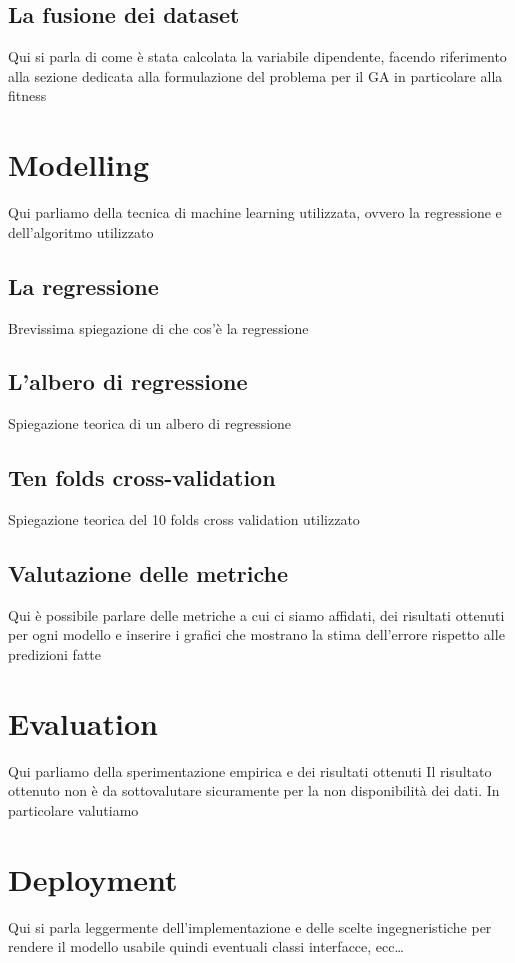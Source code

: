 \documentclass[a4paper, 11pt, oneside]{report}
\begin{document}
                \subsection{La fusione dei dataset}
                Qui si parla di come è stata calcolata la variabile dipendente, facendo riferimento alla sezione dedicata
                alla formulazione del problema per il GA in particolare alla fitness

            \section{Modelling}
            Qui parliamo della tecnica di machine learning utilizzata, ovvero la regressione e dell'algoritmo utilizzato
                \subsection{La regressione}
                Brevissima spiegazione di che cos'è la regressione
                \subsection{L'albero di regressione}
                Spiegazione teorica di un albero di regressione
                \subsection{Ten folds cross-validation}
                Spiegazione teorica del 10 folds cross validation utilizzato
                \subsection{Valutazione delle metriche}
                Qui è possibile parlare delle metriche a cui ci siamo affidati, dei risultati ottenuti per ogni modello
                e inserire i grafici che mostrano la stima dell'errore rispetto alle predizioni fatte

            \section{Evaluation}
            Qui parliamo della sperimentazione empirica e dei risultati ottenuti
            Il risultato ottenuto non è da sottovalutare sicuramente per la non disponibilità dei dati.
            In particolare valutiamo

            \section{Deployment}
            Qui si parla leggermente dell'implementazione e delle scelte ingegneristiche per rendere il modello usabile
            quindi eventuali classi interfacce, ecc\ldots
\end{document}
